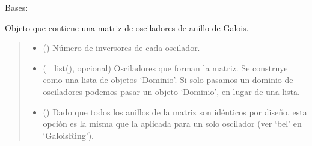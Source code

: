 \documentclass[letterpaper,10pt,english]{sphinxmanual}
\begin{document}
\begin{fulllineitems}
\label{\detokenize{fpga.ring_osc:fpga.ring_osc.GaloisMatrix}}
\pysigstartsignatures
{}
\pysigstopsignatures
\sphinxAtStartPar
Bases: 

\sphinxAtStartPar
Objeto que contiene una matriz de osciladores de anillo de Galois.
\begin{quote}\begin{description}
\begin{itemize}
\item {} 
\sphinxAtStartPar
{} (\sphinxstyleliteralemphasis{\sphinxupquote{, }}) \textendash{} Número de inversores de cada oscilador.

\item {} 
\sphinxAtStartPar
{} ({\hyperref[\detokenize{fpga.ring_osc:fpga.ring_osc.Dominio}]{}} | list(), opcional) \textendash{} Osciladores que forman la matriz. Se construye como una lista de objetos ‘Dominio’. Si solo pasamos un dominio de osciladores podemos pasar un objeto ‘Dominio’, en lugar de una lista.

\item {} 
\sphinxAtStartPar
{} (\sphinxstyleliteralemphasis{\sphinxupquote{ | }}\sphinxstyleliteralemphasis{\sphinxupquote{(}}\sphinxstyleliteralemphasis{\sphinxupquote{)}}\sphinxstyleliteralemphasis{\sphinxupquote{, }}) \textendash{} Dado que todos los anillos de la matriz son idénticos por diseño, esta opción es la misma que la aplicada para un solo oscilador (ver ‘bel’ en ‘GaloisRing’).


\end{itemize}
\end{description}
\end{quote}
\end{fulllineitems}
\end{document}
